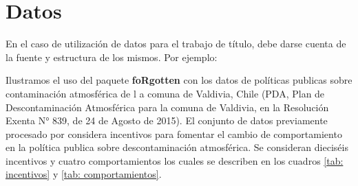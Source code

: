 \section{Datos}

En el caso de utilización de datos para el trabajo de título, debe darse cuenta de la fuente y estructura de los mismos. Por ejemplo:

Ilustramos el uso del paquete \textbf{foRgotten} con los datos de políticas publicas sobre contaminación atmosférica de l a comuna de Valdivia, Chile (PDA, Plan de Descontaminación Atmosférica para la comuna de Valdivia, en la
Resolución Exenta N° 839, de 24 de Agosto de 2015).  El conjunto de datos previamente procesado por \textcite{manna2018application} considera incentivos para fomentar el cambio de comportamiento en la política publica sobre descontaminación atmosférica. Se consideran dieciséis incentivos y cuatro comportamientos los cuales se describen en los cuadros \ref{tab: incentivos} y \ref{tab: comportamientos}.


\begin{table}[H]
\centering
\caption{Incentivos }
\label{tab: incentivos}
\end{table}

